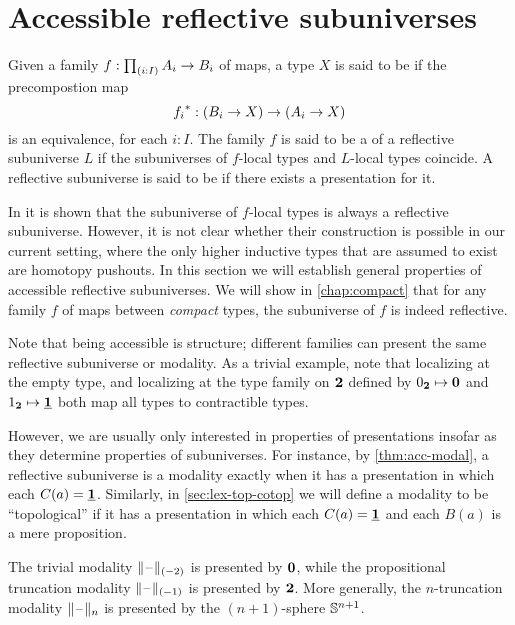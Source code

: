 \section{Accessible reflective subuniverses}\label{sec:accessible}

\begin{defn}
Given a family $f:\prd{i:I}A_i\to B_i$ of maps, a type $X$ is said to be  if the precompostion map
\begin{equation*}
{f_i}^\ast:(B_i\to X)\to (A_i\to X)
\end{equation*}
is an equivalence, for each $i:I$. The family $f$ is said to be a  of a reflective subuniverse $L$ if the subuniverses of $f$-local types and $L$-local types coincide. A reflective subuniverse is said to be  if there exists a presentation for it. 
\end{defn}

In \cite{RijkeShulmanSpitters} it is shown that the subuniverse of $f$-local types is always a reflective subuniverse. However, it is not clear whether their construction is possible in our current setting, where the only higher inductive types that are assumed to exist are homotopy pushouts. In this section we will establish general properties of accessible reflective subuniverses. We will show in \cref{chap:compact} that for any family $f$ of maps between \emph{compact} types, the subuniverse of $f$ is indeed reflective. 

\begin{rmk}
Note that being accessible is structure; different families can present the same reflective subuniverse or modality.
As a trivial example, note that localizing at the empty
type, and localizing at the type family on $\mathbf{2}$ defined by
${0_{\mathbf{2}}}\mapsto \mathbf{0}$ and ${1_{\mathbf{2}}}\mapsto \underline{\mathbf{1}}$ both map all types to contractible types.

However, we are usually only interested in properties of presentations insofar as they determine properties of subuniverses.
For instance, by \cref{thm:acc-modal}, a reflective subuniverse is a modality exactly when it has a presentation in which each $C(a)=\underline{\mathbf{1}}$.
Similarly, in \cref{sec:lex-top-cotop} we will define a modality to be ``topological'' if it has a presentation in which each $C(a)=\underline{\mathbf{1}}$ and each $B(a)$ is a mere proposition.
\end{rmk}

\begin{eg}\label{thm:trunc-acc}
The trivial modality $\Vert \mathord{\hspace{1pt}\text{--}\hspace{1pt}} \Vert_{(-2)}$ is presented by $\mathbf{0}$, while the propositional truncation modality $\Vert \mathord{\hspace{1pt}\text{--}\hspace{1pt}} \Vert_{(-1)}$ is presented by $\mathbf{2}$.  More generally, the
$n$-truncation modality $\Vert \mathord{\hspace{1pt}\text{--}\hspace{1pt}} \Vert_{n}$ is presented by the $(n+1)$-sphere $\mathbb{S}^{n+1}$.
\end{eg}


